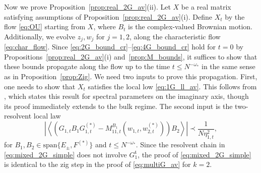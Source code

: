 \documentclass[10pt]{amsart}
\numberwithin{equation}{section}
\newcommand{\mt}{\mathfrak{t}}
\begin{document}
Now we prove Proposition~\ref{prop:real_2G_av}(ii). Let $X$ be a real matrix satisfying assumptions of Proposition~\ref{prop:real_2G_av}(i). Define $X_t$ by the flow \eqref{eq:OU} starting from $X$, where $B_t$ is the complex-valued Brownian motion. Additionally, we evolve $z_j,w_j$ for $j=1,2$, along the characteristic flow \eqref{eq:char_flow}. Since \eqref{eq:2G_bound_cr}--\eqref{eq:4G_bound_cr} hold for $t=0$ by Propositions~\ref{prop:real_2G_av}(i) and~\ref{prop:M_bounds}, it suffices to show that these bounds propagate along the flow up to the time $t\le N^{-\omega_*}$ in the same sense as in Proposition~\ref{prop:Zig}. We need two inputs to prove this propagation. First, one needs to show that $X_t$ satisfies the local low \eqref{eq:1G_ll_av}. This follows from \cite[Lemma~B.7]{cipolloni2024maximum}, which states this result for spectral parameters on the imaginary axis, though its proof immediately extends to the bulk regime. The second input is the two-resolvent local law
\begin{equation}
\left\vert\left\langle \left(G_{1,t}B_1G_{1,t}^{(*)}-M_{11,t}^{B_1}(w_{1,t},w_{2,t}^{(*)})\right)B_2\right\rangle \right\vert\prec \frac{1}{N\eta_{1,t}^2},
\label{eq:mixed_2G_simple}
\end{equation} 
for $B_1,B_2\in\mathrm{span}\{E_\pm,F^{(*)}\}$ and $t\le N^{-\omega_*}$. Since the resolvent chain in \eqref{eq:mixed_2G_simple} does not involve $G_1^\mt$, the proof of \eqref{eq:mixed_2G_simple} is identical to the zig step in the proof of \eqref{eq:multiG_av} for $k=2$.
\end{document}
